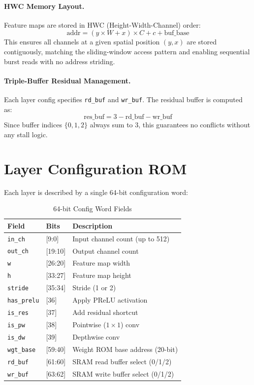 \paragraph{HWC Memory Layout.}
Feature maps are stored in HWC (Height-Width-Channel) order:
\[
  \text{addr} = (y \times W + x) \times C + c + \text{buf\_base}
\]
This ensures all channels at a given spatial position $(y, x)$ are stored contiguously, matching the sliding-window access pattern and enabling sequential burst reads with no address striding.
 
\paragraph{Triple-Buffer Residual Management.}
Each layer config specifies \texttt{rd\_buf} and \texttt{wr\_buf}.
The residual buffer is computed as:
\[
  \text{res\_buf} = 3 - \text{rd\_buf} - \text{wr\_buf}
\]
Since buffer indices $\{0,1,2\}$ always sum to 3, this guarantees no conflicts without any stall logic.
 
\section{Layer Configuration ROM}
\label{sec:config}
 
Each layer is described by a single 64-bit configuration word:
 
\begin{table}[H]
\centering
\caption{64-bit Config Word Fields}
\begin{tabular}{lll}
\toprule
\textbf{Field} & \textbf{Bits} & \textbf{Description} \\
\midrule
\texttt{in\_ch}    & [9:0]    & Input channel count (up to 512) \\
\texttt{out\_ch}   & [19:10]  & Output channel count \\
\texttt{w}         & [26:20]  & Feature map width \\
\texttt{h}         & [33:27]  & Feature map height \\
\texttt{stride}    & [35:34]  & Stride (1 or 2) \\
\texttt{has\_prelu}& [36]     & Apply PReLU activation \\
\texttt{is\_res}   & [37]     & Add residual shortcut \\
\texttt{is\_pw}    & [38]     & Pointwise ($1\times1$) conv \\
\texttt{is\_dw}    & [39]     & Depthwise conv \\
\texttt{wgt\_base} & [59:40]  & Weight ROM base address (20-bit) \\
\texttt{rd\_buf}   & [61:60]  & SRAM read buffer select (0/1/2) \\
\texttt{wr\_buf}   & [63:62]  & SRAM write buffer select (0/1/2) \\
\bottomrule
\end{tabular}
\end{table}
 
